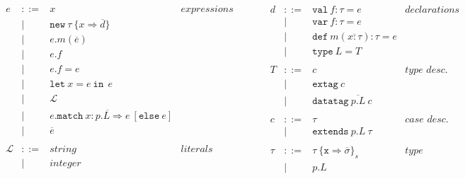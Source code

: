 \documentclass{article}
\newcommand{\keywadj}[1]{\mathtt{#1}}
\newcommand{\keyw}[1]{\keywadj{#1}~}
\begin{document}
\[\begin{array}{lll}
\begin{array}{lllr}
e & ::= & x                                                              & expressions \\
  & |   & \keywadj{new}~\tau~\{x \Rightarrow \overline{d}\}              &\\
  & |   & e.m(\overline{e})                                              &\\
  & |   & e.f                                                            &\\
  & |   & e.f = e                                                        &\\
  & |   & \keyw{let} x=e~\keyw{in}~e                                     &\\
  & |   & \mathscr{L}                                                    &\\
  & |   & e.\keyw{match} \overline{x:p.L \Rightarrow e} ~[\keyw{else} e] &\\
  & |   & \overline{e}                                                   &\\
&&\\
\mathscr{L} & ::= & string & literals \\
& | & integer &\\
&&\\
\end{array}
& ~~~~~~
&
\begin{array}{lllr}
d & ::= & \keyw{val} f : \tau = e                    & declarations \\
  & |   & \keyw{var} f : \tau = e                    &\\
  & |   & \keyw{def} m(\overline{x:\tau}) : \tau = e &\\
  & |   & \keyw{type} L = T                          &\\
&&\\
T & ::= & c                                & \textit{type desc.}\\
  & |   & \keyw{extag} c                   &\\
  & |   & \keyw{datatag} \overline{p.L} ~c &\\
&&\\
c & ::= & \tau                    & \textit{case desc.} \\
  & |   & \keyw{extends} p.L~\tau &\\
&&\\
\tau & ::= & \tau~\{\texttt{x} \Rightarrow \overline{\sigma}\}_{s} & type \\
     & |   & p.L                                                   &\\

\end{array}
\end{array}\]
\end{document}
